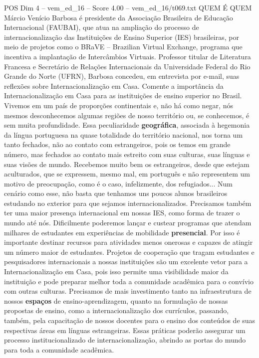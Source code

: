\begin{textsample}{POS Dim 4 – vem\_ed\_16 – Score 4.00 – vem\_ed\_16/t069.txt}  \label{ex:f4_pos_067}
QUEM É QUEM Márcio Venício Barbosa é presidente da Associação Brasileira de Educação Internacional (FAUBAI), que atua na ampliação do processo de internacionalização das Instituições de Ensino Superior (IES) brasileiras, por meio de projetos como o BRaVE – Brazilian Virtual Exchange, programa que incentiva a implantação de Intercâmbios Virtuais.
Professor titular de Literatura Francesa e Secretário de Relações Internacionais da Universidade Federal do Rio Grande do Norte (UFRN), Barbosa concedeu, em entrevista por e-mail, suas reflexões sobre Internacionalização em Casa.
Comente a importância da Internacionalização em Casa para as instituições de ensino superior no Brasil.
Vivemos em um país de proporções continentais e, não há como negar, nós mesmos desconhecemos algumas regiões de nosso território ou, se conhecemos, é sem muita profundidade.
Essa peculiaridade \textbf{geográfica}, associada à hegemonia da língua portuguesa na quase totalidade do território nacional, nos torna um tanto fechados, não ao contato com estrangeiros, pois os temos em grande número, mas fechados ao contato mais estreito com suas culturas, suas línguas e suas visões de mundo.
Recebemos muito bem os estrangeiros, desde que estejam aculturados, que se expressem, mesmo mal, em português e não representem um motivo de preocupação, como é o caso, infelizmente, dos refugiados...
Num cenário como esse, não basta que tenhamos uns poucos alunos brasileiros estudando no exterior para que sejamos internacionalizados.
Precisamos também ter uma maior presença internacional em nossas IES, como forma de trazer o mundo até nós.
Dificilmente poderemos lançar e custear programas que atendam milhares de estudantes em experiências de mobilidade \textbf{presencial}.
Por isso é importante destinar recursos para atividades menos onerosas e capazes de atingir um número maior de estudantes.
Projetos de cooperação que tragam estudantes e pesquisadores internacionais a nossas instituições são um excelente vetor para a Internacionalização em Casa, pois isso permite uma visibilidade maior da instituição e pode preparar melhor toda a comunidade acadêmica para o convívio com outras culturas.
Precisamos de mais investimento tanto na infraestrutura de nossos \textbf{espaços} de ensino-aprendizagem, quanto na formulação de nossas propostas de ensino, como a internacionalização dos currículos, passando, também, pela capacitação de nossos docentes para o ensino dos conteúdos de suas respectivas áreas em línguas estrangeiras.
Essas práticas poderão assegurar um processo institucionalizado de internacionalização, abrindo as portas do mundo para toda a comunidade acadêmica.

\end{textsample}
